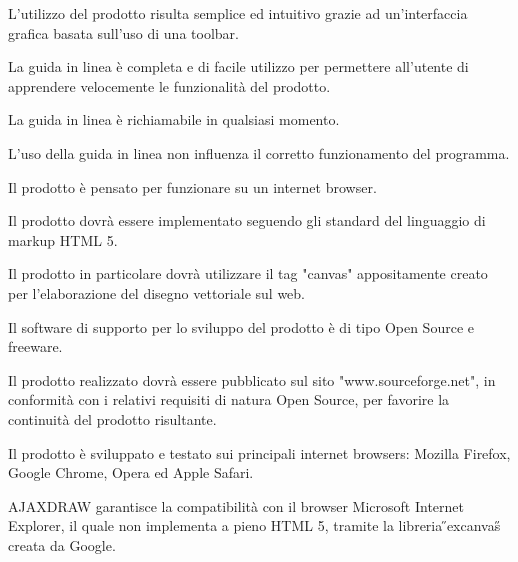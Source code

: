 

\begin{elenconumerato}{\subsubsecindent}
\item L'utilizzo del prodotto risulta semplice ed intuitivo grazie ad un'interfaccia grafica basata sull'uso di una toolbar.
\item La guida in linea \`e completa e di facile utilizzo per permettere all'utente di apprendere velocemente le funzionalit\`a del prodotto.
\item La guida in linea \`e richiamabile in qualsiasi momento.
\item L'uso della guida in linea non influenza il corretto funzionamento del programma. 
\end{elenconumerato}

\begin{elenconumerato}{\subsubsecindent}
\item Il prodotto \`e pensato per funzionare su un internet browser.
\item Il prodotto dovr\`a essere implementato seguendo gli standard del linguaggio di markup HTML 5.
\item Il prodotto in particolare dovr\` a utilizzare il tag "canvas" appositamente creato per l'elaborazione del disegno vettoriale sul web.
\item Il software di supporto per lo sviluppo del prodotto \`e di tipo Open Source e freeware.
\item Il prodotto realizzato dovr\`a essere pubblicato sul sito "www.sourceforge.net", in conformit\`a con i relativi requisiti di natura Open Source, per favorire la continuit\`a del prodotto risultante.
\item Il prodotto \`e sviluppato e testato sui principali internet browsers: Mozilla Firefox, Google Chrome, Opera ed Apple Safari.
\end{elenconumerato}
\begin{elenconumerato}{\subsubsecindent}
\item{AJAXDRAW garantisce la compatibilit\`a con il browser Microsoft Internet Explorer, il quale non implementa a pieno HTML 5, tramite la libreria \H{}excanvas\H{} creata da Google.}
\end{elenconumerato}


\newpage
